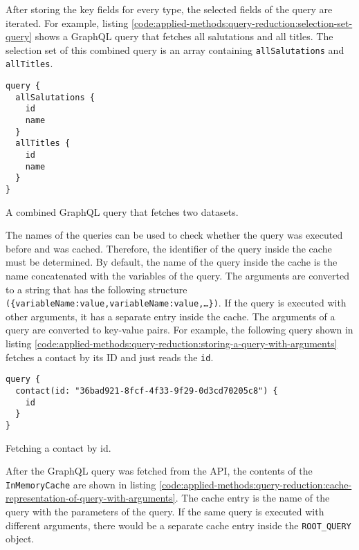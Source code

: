 After storing the key fields for every type, the selected fields of the query are iterated. For example, listing \ref{code:applied-methods:query-reduction:selection-set-query} shows a GraphQL query that fetches all salutations and all titles. The selection set of this combined query is an array containing \texttt{allSalutations} and \texttt{allTitles}.

\ifshowListings
\begin{listing}[H]
\begin{verbatim}
query {
  allSalutations {
    id
    name
  }
  allTitles {
    id
    name
  }
}
\end{verbatim}
\caption{A combined GraphQL query that fetches two datasets.}\label{code:applied-methods:query-reduction:selection-set-query}
\end{listing}
\fi

\noindent The names of the queries can be used to check whether the query was executed before and was cached. Therefore, the identifier of the query inside the cache must be determined. By default, the name of the query inside the cache is the name concatenated with the variables of the query. The arguments are converted to a string that has the following structure \texttt{(\{variableName:value,variableName:value,\dots\})}. If the query is executed with other arguments, it has a separate entry inside the cache. The arguments of a query are converted to key-value pairs. For example, the following query shown in listing \ref{code:applied-methods:query-reduction:storing-a-query-with-arguments} fetches a contact by its \ac{ID} and just reads the \texttt{id}.

\ifshowListings
\begin{listing}[H]
\begin{verbatim}
query {
  contact(id: "36bad921-8fcf-4f33-9f29-0d3cd70205c8") {
    id
  }
}
\end{verbatim}
\caption{Fetching a contact by id.}\label{code:applied-methods:query-reduction:storing-a-query-with-arguments}
\end{listing}
\fi

\noindent After the GraphQL query was fetched from the \ac{API}, the contents of the \texttt{InMemoryCache} are shown in listing \ref{code:applied-methods:query-reduction:cache-representation-of-query-with-arguments}. The cache entry is the name of the query with the parameters of the query. If the same query is executed with different arguments, there would be a separate cache entry inside the \texttt{ROOT\_QUERY} object.

